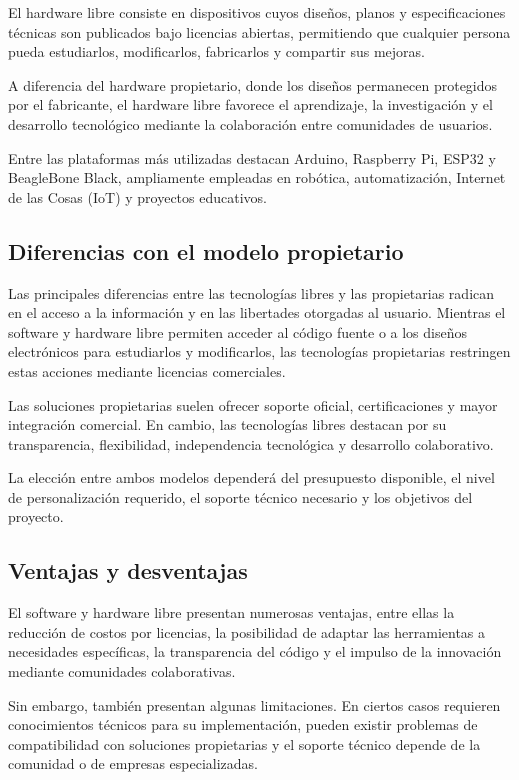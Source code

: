 \documentclass[12pt]{article}
\begin{document}
	El hardware libre consiste en dispositivos cuyos diseños, planos y especificaciones técnicas son publicados bajo licencias abiertas, permitiendo que cualquier persona pueda estudiarlos, modificarlos, fabricarlos y compartir sus mejoras.
	
	A diferencia del hardware propietario, donde los diseños permanecen protegidos por el fabricante, el hardware libre favorece el aprendizaje, la investigación y el desarrollo tecnológico mediante la colaboración entre comunidades de usuarios.
	
	Entre las plataformas más utilizadas destacan Arduino, Raspberry Pi, ESP32 y BeagleBone Black, ampliamente empleadas en robótica, automatización, Internet de las Cosas (IoT) y proyectos educativos.
	
	\subsection{Diferencias con el modelo propietario}
	
	Las principales diferencias entre las tecnologías libres y las propietarias radican en el acceso a la información y en las libertades otorgadas al usuario. Mientras el software y hardware libre permiten acceder al código fuente o a los diseños electrónicos para estudiarlos y modificarlos, las tecnologías propietarias restringen estas acciones mediante licencias comerciales.
	
	Las soluciones propietarias suelen ofrecer soporte oficial, certificaciones y mayor integración comercial. En cambio, las tecnologías libres destacan por su transparencia, flexibilidad, independencia tecnológica y desarrollo colaborativo.
	
	La elección entre ambos modelos dependerá del presupuesto disponible, el nivel de personalización requerido, el soporte técnico necesario y los objetivos del proyecto.
	
	\subsection{Ventajas y desventajas}
	
	El software y hardware libre presentan numerosas ventajas, entre ellas la reducción de costos por licencias, la posibilidad de adaptar las herramientas a necesidades específicas, la transparencia del código y el impulso de la innovación mediante comunidades colaborativas.
	
	Sin embargo, también presentan algunas limitaciones. En ciertos casos requieren conocimientos técnicos para su implementación, pueden existir problemas de compatibilidad con soluciones propietarias y el soporte técnico depende de la comunidad o de empresas especializadas.
	
\end{document}
